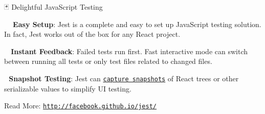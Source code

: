 🃏 Delightful Java\+Script Testing


\begin{DoxyItemize}
\item {\bfseries 👩🏻‍💻 Easy Setup}\+: Jest is a complete and easy to set up Java\+Script testing solution. In fact, Jest works out of the box for any React project.
\item {\bfseries 🏃🏽 Instant Feedback}\+: Failed tests run first. Fast interactive mode can switch between running all tests or only test files related to changed files.
\item {\bfseries 📸 Snapshot Testing}\+: Jest can \href{http://facebook.github.io/jest/docs/snapshot-testing.html}{\tt capture snapshots} of React trees or other serializable values to simplify UI testing.
\end{DoxyItemize}

Read More\+: \href{http://facebook.github.io/jest/}{\tt http\+://facebook.\+github.\+io/jest/} 